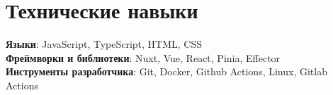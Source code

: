 \documentclass[letterpaper,11pt]{article}
\begin{document}
\section{Технические навыки}
\begin{itemize}[leftmargin=0.15in, label={}]
  \small{\item{
                \textbf{Языки}{: JavaScript, TypeScript, HTML, CSS} \\
                \textbf{Фреймворки и библиотеки}{: Nuxt, Vue, React, Pinia, Effector } \\
                \textbf{Инструменты разработчика}{: Git, Docker, Github Actions, Linux, Gitlab Actions} \\
          }}
\end{itemize}

\end{document}
